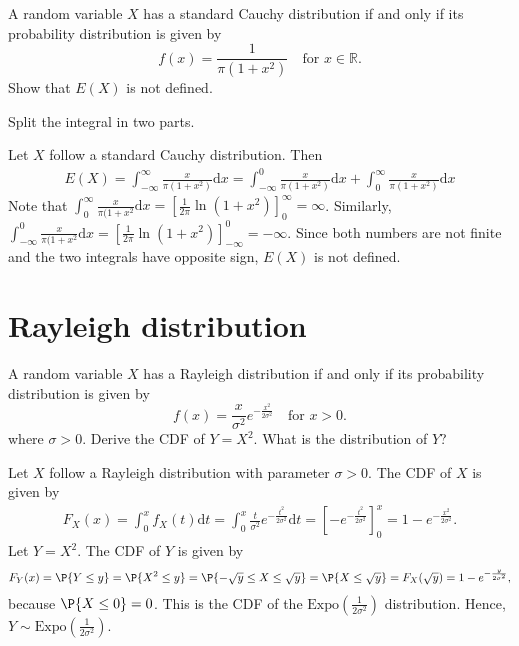 	\begin{exercise}\label{ex:chap05:04}
		A random variable $X$ has a standard Cauchy distribution if and only if its probability distribution is given by
		\begin{equation}
			f(x) = \frac{1}{\pi (1 + x^2)} \quad \text{for } x \in \mathbb{R}.
		\end{equation}
		Show that $E(X)$ is not defined.
		\begin{hint}
			Split the integral in two parts.	
		\end{hint}

		\begin{solution}
			Let $X$ follow a standard Cauchy distribution. Then
			\begin{align*}
				E(X) = \int_{-\infty}^{\infty} \frac{x}{\pi (1 + x^2)} \mathrm{d}x = \int_{-\infty}^0 \frac{x}{\pi (1 + x^2)} \mathrm{d}x + \int_0^{\infty} \frac{x}{\pi (1 + x^2)} \mathrm{d}x
			\end{align*}
			Note that $\int_0^{\infty} \frac{x}{\pi (1 + x^2} \mathrm{d}x = \left[\frac{1}{2 \pi} \ln(1 + x^2)\right]_0^{\infty} = \infty$. Similarly, $\int_{-\infty}^0 \frac{x}{\pi (1 + x^2} \mathrm{d}x = \left[\frac{1}{2 \pi} \ln(1 + x^2)\right]_{-\infty}^0 = - \infty$. Since both numbers are not finite and the two integrals have opposite sign, $E(X)$ is not defined.
		\end{solution}
	\end{exercise}

\section{Rayleigh distribution}
\label{sec:section-5.4}
	
	\begin{exercise}
		A random variable $X$ has a Rayleigh distribution if and only if its probability distribution is given by
		\begin{equation}
			f(x) = \frac{x}{\sigma^2} e^{-\frac{x^2}{2 \sigma^2}} \quad \text{for } x > 0.
		\end{equation}
		where $\sigma > 0$. Derive the CDF of $Y = X^2$. What is the distribution of $Y$?
		\begin{solution}
			Let $X$ follow a Rayleigh distribution with parameter $\sigma > 0$. The CDF of $X$ is given by
			\begin{align*}
				F_X(x) = \int_0^x f_X(t) \mathrm{d}t = \int_0^x \frac{t}{\sigma^2} e^{-\frac{t^2}{2 \sigma^2}} \mathrm{d}t = \left[- e^{-\frac{t^2}{2 \sigma^2}}\right]_0^x = 1 - e^{-\frac{x^2}{2 \sigma^2}}.
			\end{align*}
			Let $Y = X^2$. The CDF of $Y$ is given by
			\begin{align*}
				F_Y(x) = \P{Y \leq y} = \P{X^2 \leq y} = \P{-\sqrt{y}\leq X \leq \sqrt{y}}= \P{X \leq \sqrt{y}} = F_X(\sqrt{y}) = 1 - e^{-\frac{y}{2 \sigma^2}},
			\end{align*}
			because $\P{X\leq 0}=0$. This is the CDF of the $\text{Expo}\left(\frac{1}{2 \sigma^2}\right)$ distribution. Hence, $Y \sim \text{Expo}\left(\frac{1}{2 \sigma^2}\right)$.
		\end{solution}
	\end{exercise}


